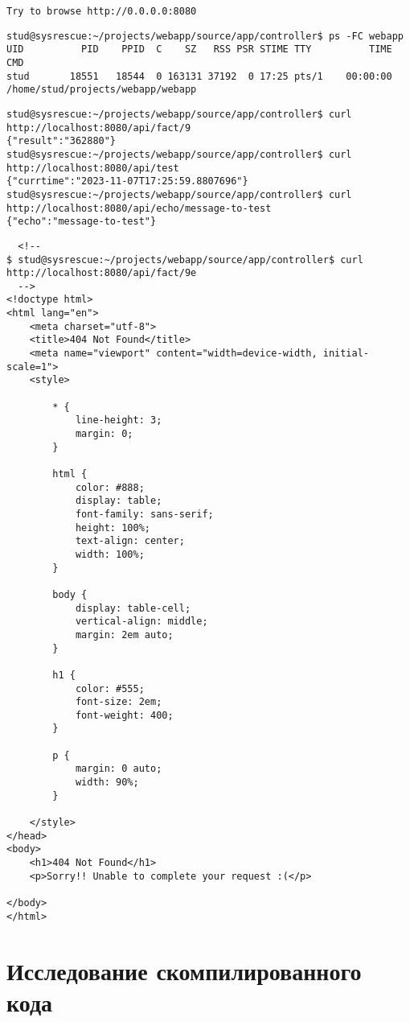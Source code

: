 \documentclass{studrep}
\begin{document}
\begin{verbatim}
Try to browse http://0.0.0.0:8080
\end{verbatim}


\begin{verbatim}
stud@sysrescue:~/projects/webapp/source/app/controller$ ps -FC webapp
UID          PID    PPID  C    SZ   RSS PSR STIME TTY          TIME CMD
stud       18551   18544  0 163131 37192  0 17:25 pts/1    00:00:00 /home/stud/projects/webapp/webapp
\end{verbatim}

\begin{verbatim}
stud@sysrescue:~/projects/webapp/source/app/controller$ curl http://localhost:8080/api/fact/9
{"result":"362880"}
stud@sysrescue:~/projects/webapp/source/app/controller$ curl http://localhost:8080/api/test
{"currtime":"2023-11-07T17:25:59.8807696"}
stud@sysrescue:~/projects/webapp/source/app/controller$ curl http://localhost:8080/api/echo/message-to-test
{"echo":"message-to-test"}
\end{verbatim}

\begin{verbatim}
  <!--
$ stud@sysrescue:~/projects/webapp/source/app/controller$ curl http://localhost:8080/api/fact/9e
  -->
<!doctype html>
<html lang="en">
    <meta charset="utf-8">
    <title>404 Not Found</title>
    <meta name="viewport" content="width=device-width, initial-scale=1">
    <style>

        * {
            line-height: 3;
            margin: 0;
        }

        html {
            color: #888;
            display: table;
            font-family: sans-serif;
            height: 100%;
            text-align: center;
            width: 100%;
        }

        body {
            display: table-cell;
            vertical-align: middle;
            margin: 2em auto;
        }

        h1 {
            color: #555;
            font-size: 2em;
            font-weight: 400;
        }

        p {
            margin: 0 auto;
            width: 90%;
        }

    </style>
</head>
<body>
    <h1>404 Not Found</h1>
    <p>Sorry!! Unable to complete your request :(</p>

</body>
</html>
\end{verbatim}

\chapter{Исследование скомпилированного кода}
\end{document}
